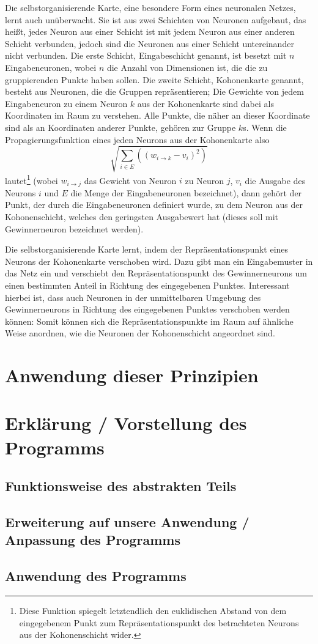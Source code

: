\documentclass[twoside,a4paper,draft]{article}
\newcommand{\commonlettrine}[1]{\lettrine[nindent=0em,lines=2]{#1}}
\begin{document}
\begin{multicols}{2}
\commonlettrine{D}ie selbstorganisierende Karte, eine besondere Form eines neuronalen Netzes, lernt auch unüberwacht. Sie ist aus zwei Schichten von Neuronen aufgebaut, das heißt, jedes Neuron aus einer Schicht ist mit jedem Neuron aus einer anderen Schicht verbunden, jedoch sind die Neuronen aus einer Schicht untereinander nicht verbunden. Die erste Schicht, Eingabeschicht genannt, ist besetzt mit \(n\) Eingabeneuronen, wobei \(n\) die Anzahl von Dimensionen ist, die die zu gruppierenden Punkte haben sollen. Die zweite Schicht, Kohonenkarte genannt, besteht aus Neuronen, die die Gruppen repräsentieren; Die Gewichte von jedem Eingabeneuron zu einem Neuron \(k\) aus der Kohonenkarte sind dabei als Koordinaten im Raum zu verstehen. Alle Punkte, die näher an dieser Koordinate sind als an Koordinaten anderer Punkte, gehören zur Gruppe \(k\)s. Wenn die Propagierungsfunktion eines jeden Neurons aus der Kohonenkarte also
\[
\sqrt{\sum_{i\in{}E} \left((w_{i\rightarrow{}k} - v_i)^2\right)}
\]
lautet\footnote{Diese Funktion spiegelt letztendlich den euklidischen Abstand von dem eingegebenem Punkt zum Repräsentationspunkt des betrachteten Neurons aus der Kohonenschicht wider.} (wobei \(w_{i\rightarrow{}j}\) das Gewicht von Neuron \(i\) zu Neuron \(j\), \(v_i\) die Ausgabe des Neurons \(i\) und \(E\) die Menge der Eingabeneuronen bezeichnet), dann gehört der Punkt, der durch die Eingabeneuronen definiert wurde, zu dem Neuron aus der Kohonenschicht, welches den geringsten Ausgabewert hat (dieses soll mit \glqq{}Gewinnerneuron\grqq{} bezeichnet werden).

Die selbstorganisierende Karte lernt, indem der Repräsentationspunkt eines Neurons der Kohonenkarte verschoben wird. Dazu gibt man ein Eingabemuster in das Netz ein und verschiebt den Repräsentationspunkt des Gewinnerneurons um einen bestimmten Anteil in Richtung des eingegebenen Punktes. Interessant hierbei ist, dass auch Neuronen in der unmittelbaren Umgebung des Gewinnerneurons in Richtung des eingegebenen Punktes verschoben werden können: Somit können sich die Repräsentationspunkte im Raum auf ähnliche Weise anordnen, wie die Neuronen der Kohonenschicht angeordnet sind.

\section{Anwendung dieser Prinzipien}

\section{Erklärung / Vorstellung des Programms}

\subsection{Funktionsweise des abstrakten Teils}

\subsection{Erweiterung auf unsere Anwendung / Anpassung des Programms}

\subsection{Anwendung des Programms}
\end{multicols}
\end{document}

